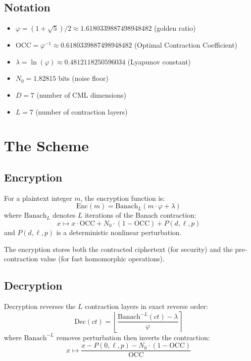\documentclass[11pt,a4paper]{article}
\begin{document}
\subsection{Notation}
\begin{itemize}
\item $\varphi = (1 + \sqrt{5})/2 \approx 1.6180339887498948482$ (golden ratio)
\item $\text{OCC} = \varphi^{-1} \approx 0.6180339887498948482$ (Optimal Contraction Coefficient)
\item $\lambda = \ln(\varphi) \approx 0.4812118250596034$ (Lyapunov constant)
\item $N_0 = 1.82815$ bits (noise floor)
\item $D = 7$ (number of CML dimensions)
\item $L = 7$ (number of contraction layers)
\end{itemize}

\section{The Scheme}

\subsection{Encryption}

\begin{definition}[Encryption]
For a plaintext integer $m$, the encryption function is:
\[
\text{Enc}(m) = \text{Banach}_L(m \cdot \varphi + \lambda)
\]
where $\text{Banach}_L$ denotes $L$ iterations of the Banach contraction:
\[
x \mapsto x \cdot \text{OCC} + N_0 \cdot (1 - \text{OCC}) + P(d, \ell, p)
\]
and $P(d, \ell, p)$ is a deterministic nonlinear perturbation.

The encryption stores both the contracted ciphertext (for security) and the pre-contraction value (for fast homomorphic operations).
\end{definition}

\subsection{Decryption}

\begin{definition}[Decryption]
Decryption reverses the $L$ contraction layers in exact reverse order:
\[
\text{Dec}(ct) = \left\lfloor \frac{\text{Banach}^{-L}(ct) - \lambda}{\varphi} \right\rceil
\]
where $\text{Banach}^{-L}$ removes perturbation then inverts the contraction:
\[
x \mapsto \frac{x - P(0, \ell, p) - N_0 \cdot (1 - \text{OCC})}{\text{OCC}}
\]
\end{definition}
\end{document}
